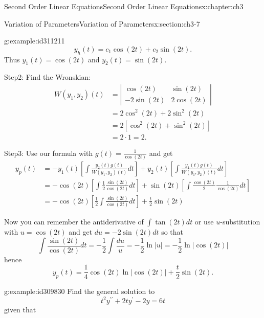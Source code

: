 \documentclass[oneside,10pt,]{book}
\numberwithin{equation}{section}
\numberwithin{equation}{section}
\newcommand{\amp}{&}
\begin{document}
\begin{chapterptx}{Second Order Linear Equations}{}{Second Order Linear Equations}{}{}{x:chapter:ch3}
\begin{sectionptx}{Variation of Parameters}{}{Variation of Parameters}{}{}{x:section:ch3-7}
\begin{example}{}{g:example:id311211}
\begin{equation*}
y_{h}(t)=c_{1}\cos(2t)+c_{2}\sin\left(2t\right).
\end{equation*}
Thus \(y_{1}(t)=\cos(2t)\) and \(y_{2}(t)=\sin\left(2t\right)\).%
\par
Step2: Find the Wronskian:%
\begin{align*}
W(y_{1},y_{2})(t) \amp =\left|\begin{array}{cc}
\cos(2t) \amp \sin\left(2t\right)\\
-2\sin(2t) \amp 2\cos(2t)
\end{array}\right|\\
\amp =2\cos^{2}(2t)+2\sin^{2}(2t)\\
\amp =2\left[\cos^{2}(2t)+\sin^{2}(2t)\right]\\
\amp =2\cdot1=2.
\end{align*}
%
\par
Step3: Use our formula with \(g(t)=\frac{1}{\cos\left(2t\right)}\) and get%
\begin{align*}
y_{p}(t) \amp =-y_{1}(t)\left[\int\frac{y_{2}(t)g(t)}{W\left(y_{1},y_{2}\right)(t)}dt\right]+y_{2}(t)\left[\int\frac{y_{1}(t)g(t)}{W\left(y_{1},y_{2}\right)(t)}dt\right]\\
\amp =-\cos(2t)\left[\int\frac{1}{2}\frac{\sin(2t)}{\cos\left(2t\right)}dt\right]+\sin(2t)\left[\int\frac{\cos(2t)}{2}\frac{1}{\cos\left(2t\right)}dt\right]\\
\amp =-\cos(2t)\left[\frac{1}{2}\int\frac{\sin(2t)}{\cos\left(2t\right)}dt\right]+\frac{t}{2}\sin(2t)
\end{align*}
%
\par
Now you can remember the antiderivative of \(\int\tan(2t)dt\) or use \(u\)-substitution with \(u=\cos(2t)\) and get \(du=-2\sin(2t)dt\) so that%
\begin{equation*}
\int\frac{\sin(2t)}{\cos\left(2t\right)}dt=-\frac{1}{2}\int\frac{du}{u}=-\frac{1}{2}\ln\left|u\right|=-\frac{1}{2}\ln\left|\cos(2t)\right|
\end{equation*}
hence%
\begin{equation*}
y_{p}(t)=\frac{1}{4}\cos(2t)\ln\left|\cos(2t)\right|+\frac{t}{2}\sin(2t).
\end{equation*}
%
\end{example}
\begin{example}{}{g:example:id309830}%
Find the general solution to%
\begin{equation*}
t^{2}y^{\prime\prime}+2ty^{\prime}-2y=6t
\end{equation*}
given that%
\begin{equation*}

\end{equation*}
\end{example}
\end{sectionptx}
\end{chapterptx}
\end{document}

